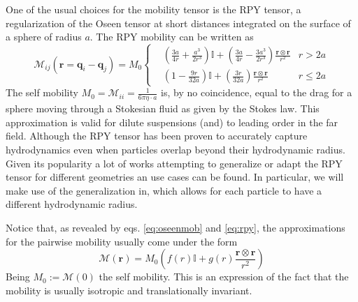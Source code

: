\documentclass[ twoside,openright,titlepage,numbers=noenddot,%
headinclude,footinclude,cleardoublepage=empty,abstract=on,
BCOR=5mm,paper=a4,fontsize=11pt, dvipsnames
]{scrreprt}
\renewcommand{\vec}[1]{\bm{#1}}
\newcommand{\tens}[1]{\bm{\mathcal{#1}}}
\begin{document}
One of the usual choices for the mobility tensor is the \gls{RPY} tensor\cite{Rotne1969,Yamakawa1970}, a regularization of the Oseen tensor at short distances integrated on the surface of a sphere of radius $a$. The \gls{RPY} mobility can be written as
\begin{equation}
  \label{eq:rpy}
  \tens{M}_{ij}(\vec{r} = \vec{q}_i-\vec{q}_j) = M_0\left\{
  \begin{aligned}
    &\left( \frac{3a}{4r} + \frac{a^3}{2r^3} \right)\mathbb{I} + \left(\frac{3a}{4r} - \frac{3a^3}{2r^3}\right)\frac{\vec{r}\otimes\vec{r}}{r^2}  & r > 2a\\
    &\left(1 - \frac{9r}{32a} \right)\mathbb{I} + \left( \frac{3r}{32a} \right)\frac{\vec{r}\otimes\vec{r}}{r^2} & r \le 2a
  \end{aligned}\right.
\end{equation}
The self mobility $M_0 = \tens{M}_{ii} = \frac{1}{6\pi\eta·a}$ is, by no coincidence, equal to the drag for a sphere moving through a Stokesian fluid as given by the Stokes law\cite{Dhont1996}.
This approximation is valid for dilute suspensions (and) to leading order in the far field. Although the \gls{RPY} tensor has been proven to accurately capture hydrodynamics even when particles overlap beyond their hydrodynamic radius\cite{Ermak1978}.
Given its popularity a lot of works attempting to generalize or adapt the \gls{RPY} tensor for different geometries an use cases can be found\cite{Wajnryb2013,Liang2013,Guan2018,Fiore2017}. In particular, we will make use of the generalization in\cite{Zuk2014}, which allows for each particle to have a different hydrodynamic radius.

Notice that, as revealed by eqs. \eqref{eq:oseenmob} and \eqref{eq:rpy}, the approximations for the pairwise mobility usually come under the form
\begin{equation}
  \tens{M}(\vec{r}) = M_0 \left(f(r)\mathbb{I} + g(r)\frac{\vec{r}\otimes\vec{r}}{r^2}\right)
\end{equation}
Being $M_0 := \tens{M}(0)$ the self mobility.
This is an expression of the fact that the mobility is usually isotropic and translationally invariant.
\end{document}
